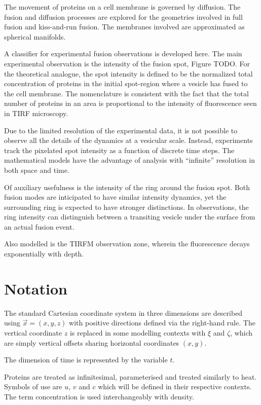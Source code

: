 \documentclass{report}
\begin{document}
The movement of proteins on a cell membrane is governed by diffusion. The fusion and diffusion processes are explored for the geometries involved in full fusion and kiss-and-run fusion. The membranes involved are approximated as spherical manifolds.

A classifier for experimental fusion observations is developed here. The main experimental observation is the intensity of the fusion spot, Figure TODO. For the theoretical analogue, the spot intensity is defined to be the normalized total concentration of proteins in the initial spot-region where a vesicle has fused to the cell membrane. The nomenclature is consistent with the fact that the total number of proteins in an area is proportional to the intensity of fluorescence seen in TIRF microscopy.

Due to the limited resolution of the experimental data, it is not possible to observe all the details of the dynamics at a vesicular scale. Instead, experiments track the pixelated spot intensity as a function of discrete time steps. The mathematical models have the advantage of analysis with ``infinite'' resolution in both space and time.

Of auxiliary usefulness is the intensity of the ring around the fusion spot. Both fusion modes are inticipated to have similar intensity dynamics, yet the surrounding ring is expected to have stronger distinctions. In observations, the ring intensity can distinguish between a transiting vesicle under the surface from an actual fusion event.

Also modelled is the TIRFM observation zone, wherein the fluorescence decays exponentially with depth.

\section{Notation}
The standard Cartesian coordinate system in three dimensions are described using $\vec{x} = (x, y, z)$ with positive directions defined via the right-hand rule. The vertical coordinate $z$ is replaced in some modelling contexts with $\xi$ and $\zeta$, which are simply vertical offsets sharing horizontal coordinates $(x, y)$.

The dimension of time is represented by the variable $t$.

Proteins are treated as infinitesimal, parameterised and treated similarly to heat. Symbols of use are $u$, $v$ and $c$ which will be defined in their respective contexts. The term concentration is used interchangeably with density.
\end{document}

